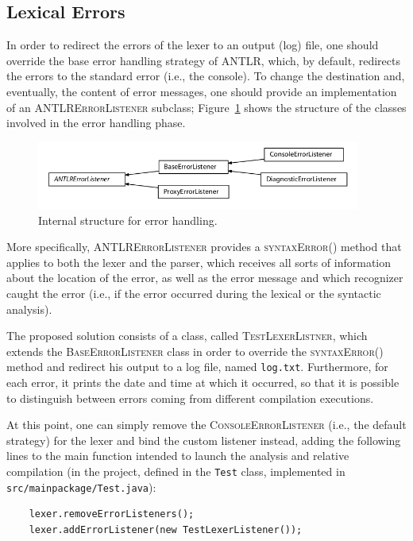 \documentclass[11pt]{article} %
\begin{document}
\subsection{Lexical Errors}
In order to redirect the errors of the lexer to an output (log) file, one should override the base error handling strategy of ANTLR, which, by default, redirects the errors to the standard error (i.e., the console). To change the destination and, eventually, the content of error messages, one should provide an implementation of an \textsc{ANTLRErrorListener} subclass; Figure~\ref{fig:err} shows the structure of the classes involved in the error handling phase.
\begin{figure}
\includegraphics[width=0.95\textwidth]{errorListener.png}
\caption{Internal structure for error handling\cite{reference}.}
\label{fig:err}
\end{figure}   
More specifically, \textsc{ANTLRErrorListener} provides a \textsc{syntaxError()} method that applies to both the lexer and the parser, which receives all sorts of information about the location of the error, as well as the error message and which recognizer caught the error (i.e., if the error occurred during the lexical or the syntactic analysis).   

\medskip

The proposed solution consists of a class, called \textsc{TestLexerListner}, which extends the \textsc{BaseErrorListener} class in order to override the \textsc{syntaxError()} method and redirect his output to a log file, named \verb|log.txt|. Furthermore, for each error, it prints the date and time at which it occurred, so that it is possible to distinguish between errors coming from different compilation executions. 

\medskip

At this point, one can simply remove the \textsc{ConsoleErrorListener} (i.e., the default strategy) for the lexer and bind the custom listener instead, adding the following lines to the main function intended to launch the analysis and relative compilation (in the project, defined in the \verb|Test| class, implemented in \verb|src/mainpackage/Test.java|):
\begin{lstlisting}
    lexer.removeErrorListeners();
    lexer.addErrorListener(new TestLexerListener());
\end{lstlisting}
\end{document}
